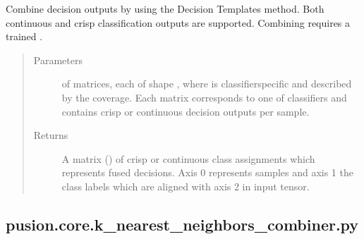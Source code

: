 \documentclass[letterpaper,10pt,english]{sphinxmanual}
\begin{document}
\begin{fulllineitems}
\begin{fulllineitems}
\label{\detokenize{pusion.core.decision_templates_combiner:pusion.core.decision_templates_combiner.CRDecisionTemplatesCombiner.combine}}
\sphinxAtStartPar
Combine decision outputs by using the Decision Templates method.
Both continuous and crisp classification outputs are supported. Combining requires a trained
{\hyperref[\detokenize{pusion.core.decision_templates_combiner:pusion.core.decision_templates_combiner.CRDecisionTemplatesCombiner}]{}}.
\begin{quote}\begin{description}
\item[{Parameters}] \leavevmode
\sphinxAtStartPar
{} \textendash{}  of  matrices, each of shape ,
where  is classifier\sphinxhyphen{}specific and described by the coverage. Each matrix corresponds to
one of  classifiers and contains crisp or continuous decision outputs per sample.

\item[{Returns}] \leavevmode
\sphinxAtStartPar
A matrix () of crisp or continuous class assignments which represents fused decisions.
Axis 0 represents samples and axis 1 the class labels which are aligned with axis 2 in
 input tensor.

\end{description}\end{quote}

\end{fulllineitems}


\end{fulllineitems}



\subsection{pusion.core.k\_nearest\_neighbors\_combiner.py}
\label{\detokenize{pusion.core.k_nearest_neighbors_combiner:module-pusion.core.k_nearest_neighbors_combiner}}\label{\detokenize{pusion.core.k_nearest_neighbors_combiner:pusion-core-k-nearest-neighbors-combiner-py}}\label{\detokenize{pusion.core.k_nearest_neighbors_combiner:knn-cref}}\label{\detokenize{pusion.core.k_nearest_neighbors_combiner::doc}}
\end{document}

